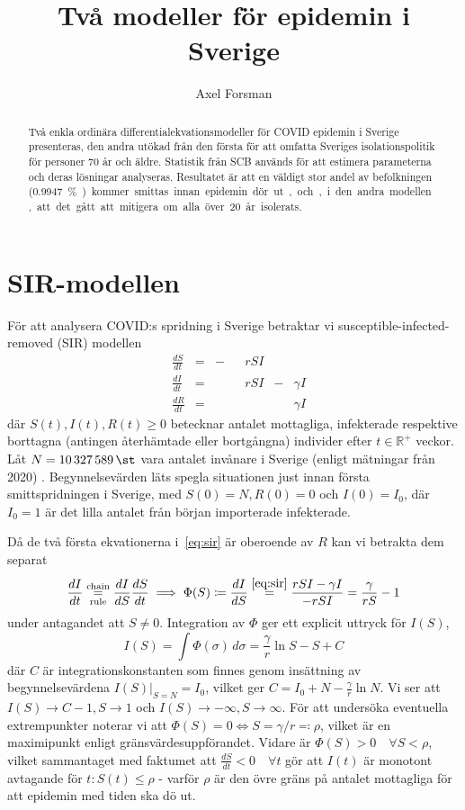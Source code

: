 \documentclass{article}
\title{Två modeller för \covid{} epidemin i Sverige}
\author{Axel Forsman}
\newcommand\covid{COVID\nobreakdash-19}
\begin{document}
\maketitle

\begin{abstract}
	Två enkla ordinära differentialekvationsmodeller
	för \covid{} epidemin i Sverige presenteras,
	den andra utökad från den första för att omfatta
	Sveriges isolationspolitik för personer 70 år och äldre.
	Statistik från SCB används för att estimera parameterna
	och deras lösningar analyseras.
	Resultatet är att en väldigt stor andel av befolkningen
	(\SI{0.9947}\percent) kommer smittas innan epidemin dör ut,
	och, i den andra modellen, att det gått att mitigera
	om alla över 20 år isolerats.
\end{abstract}

\section{SIR-modellen}

För att analysera \covid:s spridning i Sverige
betraktar vi susceptible-infected-removed (SIR) modellen
\begin{equation}\label{eq:sir}
	\begin{alignedat}{4}
		& \frac{dS}{dt} &=& -&&rSI && \\
		& \frac{dI}{dt} &=& &&rSI &-& \gamma I \\
		& \frac{dR}{dt} &=& && &&\gamma I
	\end{alignedat}
\end{equation}
där $S(t), I(t), R(t) \ge 0$ betecknar antalet mottagliga, infekterade
respektive borttagna (antingen återhämtade eller bortgångna)
individer efter $t \in \mathbb R^+$ veckor.
\def\N{10327589}
Låt $N = \SI{10327589}\st$ vara antalet invånare i Sverige
(enligt mätningar från 2020) \autocite{population}.
Begynnelsevärden läts spegla situationen just innan
första smittspridningen i Sverige,
med $S(0) = N, R(0) = 0$ och $I(0) = I_0$,
där $I_0 = 1$ är det lilla antalet från början importerade infekterade.

Då de två första ekvationerna i~\eqref{eq:sir}
är oberoende av $R$
kan vi betrakta dem separat
$$ \frac{dI}{dt} \overset{\text{chain}}{\underset{\text{rule}}=} \frac{dI}{dS} \frac{dS}{dt}
\implies \Phi(S) \coloneqq \frac{dI}{dS} \overset{\eqref{eq:sir}}= \frac{rSI - \gamma I}{-rSI} = \frac\gamma{rS} - 1 $$
under antagandet att $S \ne 0$.
Integration av $\Phi$ ger ett explicit uttryck för $I(S)$,
$$ I(S) = \int \Phi(\sigma) \, d\sigma = \frac\gamma r \ln S - S + C $$
där $C$ är integrationskonstanten som finnes genom
insättning av begynnelsevärdena $I(S) \vert_{S=N} = I_0$,
vilket ger $C = I_0 + N - \frac\gamma r \ln N$.
Vi ser att $I(S) \to C - 1, S \to 1$ och $I(S) \to -\infty, S \to \infty$.
För att undersöka eventuella extrempunkter
noterar vi att $\Phi(S) = 0 \Leftrightarrow S = \gamma / r \eqqcolon \rho$,
vilket är en maximipunkt enligt gränsvärdesuppförandet.
Vidare är $\Phi(S) > 0 \quad \forall S < \rho$,
vilket sammantaget med faktumet att
$\frac{dS}{dt} < 0 \quad \forall t$
gör att $I(t)$ är monotont avtagande för $t : S(t) \le \rho$ -
varför $\rho$ är den övre gräns på antalet mottagliga
för att epidemin med tiden ska dö ut.
\end{document}
